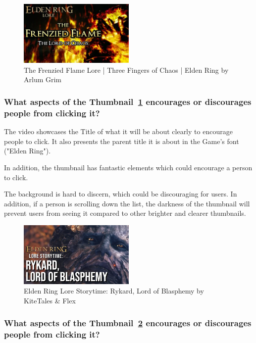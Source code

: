 \documentclass{article}
\begin{document}
\begin{figure}[h!]
\centering
\includegraphics[width=0.5\textwidth]{Arlum Grim.png}
\caption{The Frenzied Flame Lore | Three Fingers of Chaos | Elden Ring by Arlum Grim}
\label{fig:thumbnail1}
\end{figure}

\subsubsection{\textbf{What aspects of the Thumbnail~\ref{fig:thumbnail1} encourages or discourages people from clicking it?}}

The video showcases the Title of what it will be about clearly to encourage people to click. It also presents the parent title it is about in the Game's font ("Elden Ring"). 

In addition, the thumbnail has fantastic elements which could encourage a person to click. 

The background is hard to discern, which could be discouraging for users. In addition, if a person is scrolling down the list, the darkness of the thumbnail will prevent users from seeing it compared to other brighter and clearer thumbnails. 

\begin{figure}[h!]
\centering
\includegraphics[width=0.5\textwidth]{KiteTales and Flex.png}
\caption{Elden Ring Lore Storytime: Rykard, Lord of Blasphemy by KiteTales \& Flex}
\label{fig:thumbnail2}
\end{figure}

\subsubsection{\textbf{What aspects of the Thumbnail~\ref{fig:thumbnail2} encourages or discourages people from clicking it?}}
\end{document}

